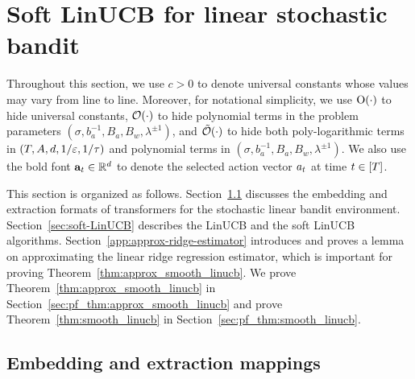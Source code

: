 \section{Soft LinUCB for linear stochastic bandit}\label{app:linUCB}
Throughout this section, we use $c>0$ to denote universal constants whose values may vary from line to line.
Moreover, for notational simplicity, we use ${\mathrm{O}}(\cdot)$ to hide universal constants, $\mathcal{O}(\cdot)$ to hide polynomial terms in the problem parameters $(\sigma,b_a^{-1},B_a,B_w,\lambda^{\pm1})$, and ${\tilde{\mathcal O}}(\cdot)$ to hide both poly-logarithmic terms in $(T,A,d,1/\varepsilon,1/{\tau})$ and  polynomial terms in  $(\sigma,b_a^{-1},B_a,B_w,\lambda^{\pm1})$. We also use the bold font ${\mathbf a}_t\in\mathbb{R}^d$ to denote the selected action vector ${a}_t$ at time $t\in[{T}]$.


This section is organized as follows. Section~\ref{sec:tf_embed_bandit} discusses the embedding and extraction formats of transformers for the stochastic linear bandit environment. Section~\ref{sec:soft-LinUCB} describes the LinUCB and the soft LinUCB algorithms. Section~\ref{app:approx-ridge-estimator} introduces and proves a lemma on approximating the linear ridge regression estimator, which is important for proving Theorem~\ref{thm:approx_smooth_linucb}. We prove Theorem~\ref{thm:approx_smooth_linucb} in Section~\ref{sec:pf_thm:approx_smooth_linucb} and prove Theorem~\ref{thm:smooth_linucb} in Section~\ref{sec:pf_thm:smooth_linucb}. 


\subsection{Embedding and extraction mappings}\label{sec:tf_embed_bandit}

